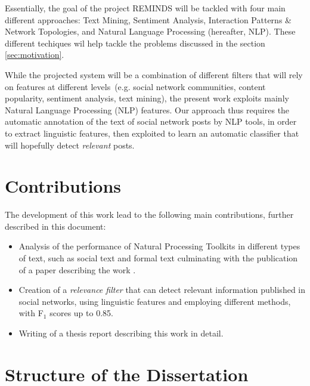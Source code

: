 Essentially, the goal of the project REMINDS will be tackled with four main different approaches: Text Mining, Sentiment Analysis, Interaction Patterns \& Network Topologies, and Natural Language Processing (hereafter, NLP). These different techiques wil help tackle the problems discussed in the section \ref{sec:motivation}. 
 

While the projected system will be a combination of different filters that will rely on features at different levels~(e.g. social network communities, content popularity, sentiment analysis, text mining), the present work exploits mainly Natural Language Processing (NLP) features.
Our approach thus requires the automatic annotation of the text of social network posts by NLP tools, in order to extract linguistic features, then exploited to learn an automatic classifier that will hopefully detect \textit{relevant} posts.


\section{Contributions}

The development of this work lead to the following main contributions, further described in this document:
\begin{itemize}
	\item Analysis of the performance of Natural Processing Toolkits in different types of text, such as social text and formal text culminating with the publication of a paper describing the work \citep{pinto2016NLPPerformance}.
	\item Creation of a \textit{relevance filter} that can detect relevant information published in social networks, using linguistic features and employing  different methods, with F$_1$ scores up to 0.85.
    \item Writing of a thesis report describing this work in detail.
    
\end{itemize}     


\section{Structure of the Dissertation}

